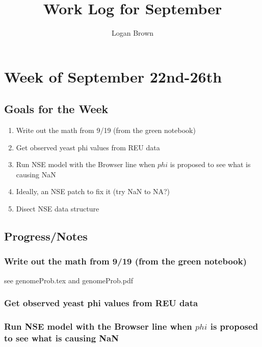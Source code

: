 

\title{Work Log for September}
\author{Logan Brown}


\maketitle


\setcounter{section}{3} %
\setcounter{subsection}{-1}
\setcounter{subsubsection}{0}

\section{Week of September 22nd-26th}
\subsection{Goals for the Week}
\begin{enumerate}
\item Write out the math from 9/19 (from the green notebook)
\item Get observed yeast phi values from REU data
\item Run NSE model with the Browser line when $phi$ is proposed to see what is causing NaN
\item Ideally, an NSE patch to fix it (try NaN to NA?)
\item Disect NSE data structure
\end{enumerate}

\subsection{Progress/Notes}

\subsubsection{Write out the math from 9/19 (from the green notebook)}

see genomeProb.tex and genomeProb.pdf

\subsubsection{Get observed yeast phi values from REU data}

\subsubsection{Run NSE model with the Browser line when $phi$ is proposed to see what is causing NaN}


